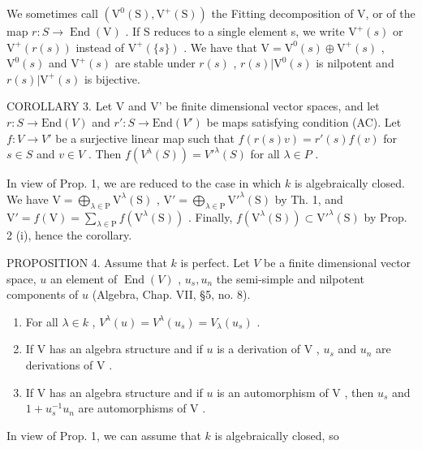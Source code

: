 We sometimes call \((\mathrm{V}^{0}(\mathrm{S}),\mathrm{V}^{+}(\mathrm{S}))\) the Fitting decomposition of V, or of the map \(r:S\to\operatorname{End}(\mathrm{V})\) . If S reduces to a single element s, we write \(\mathrm{V}^{+}(s)\) or \(\mathrm{V}^{+}(r(s))\) instead of \(\mathrm{V}^{+}(\{s\})\) . We have that \(\mathrm{V}=\mathrm{V}^{0}(s)\oplus\mathrm{V}^{+}(s)\) , \(\mathrm{V}^{0}(s)\) and \(\mathrm{V}^{+}(s)\) are stable under \(r(s)\) , \(r(s)|\mathrm{V}^{0}(s)\) is nilpotent and \(r(s)|\mathrm{V}^{+}(s)\) is bijective.

COROLLARY 3. Let V and V' be finite dimensional vector spaces, and let \(r: S \to \text{End}(V)\) and \(r': S \to \text{End}(V')\) be maps satisfying condition (AC). Let \(f: V \to V'\) be a surjective linear map such that \(f(r(s)v) = r'(s)f(v)\) for \(s \in S\) and \(v \in V\) . Then \(f(V^{\lambda}(S)) = V'^{\lambda}(S)\) for all \(\lambda \in P\) .

In view of Prop. 1, we are reduced to the case in which \(k\) is algebraically closed. We have \(\mathrm{V} = \bigoplus_{\lambda \in \mathrm{P}} \mathrm{V}^{\lambda}(\mathrm{S})\) , \(\mathrm{V}' = \bigoplus_{\lambda \in \mathrm{P}} \mathrm{V}'^{\lambda}(\mathrm{S})\) by Th. 1, and \(\mathrm{V}' = f(\mathrm{V}) = \sum_{\lambda \in \mathrm{P}} f(\mathrm{V}^{\lambda}(\mathrm{S}))\) . Finally, \(f(\mathrm{V}^{\lambda}(\mathrm{S})) \subset \mathrm{V}'^{\lambda}(\mathrm{S})\) by Prop. 2 (i), hence the corollary.

PROPOSITION 4. Assume that \(k\) is perfect. Let \(V\) be a finite dimensional vector space, \(u\) an element of \(\operatorname{End}(V)\) , \(u_s, u_n\) the semi-simple and nilpotent components of \(u\) (Algebra, Chap. VII, §5, no. 8).

\begin{enumerate}
\def\labelenumi{(\roman{enumi})}
\item
  For all \(\lambda \in k\) , \(V^{\lambda}(u) = V^{\lambda}(u_s) = V_{\lambda}(u_s)\) .
\item
  If \(\mathrm{V}\) has an algebra structure and if \(u\) is a derivation of \(\mathrm{V}\) , \(u_{s}\) and \(u_{n}\) are derivations of \(\mathrm{V}\) .
\item
  If \(\mathrm{V}\) has an algebra structure and if \(u\) is an automorphism of \(\mathrm{V}\) , then \(u_{s}\) and \(1 + u_{s}^{-1}u_{n}\) are automorphisms of \(\mathrm{V}\) .
\end{enumerate}

In view of Prop. 1, we can assume that \(k\) is algebraically closed, so

